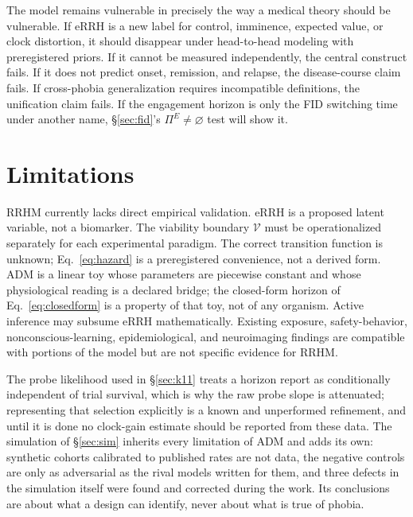 \documentclass[9pt,twocolumn]{article}
\newcommand{\Vset}{\mathcal{V}}
\begin{document}
The model remains vulnerable in precisely the way a medical theory should be vulnerable. If eRRH is a new label for control, imminence, expected value, or clock distortion, it should disappear under head-to-head modeling with preregistered priors. If it cannot be measured independently, the central construct fails. If it does not predict onset, remission, and relapse, the disease-course claim fails. If cross-phobia generalization requires incompatible definitions, the unification claim fails. If the engagement horizon is only the FID switching time under another name, \S\ref{sec:fid}'s $\Pi^E\neq\varnothing$ test will show it.

\section{Limitations}
\label{sec:limits}
RRHM currently lacks direct empirical validation. eRRH is a proposed latent variable, not a biomarker. The viability boundary $\Vset$ must be operationalized separately for each experimental paradigm. The correct transition function is unknown; Eq.~\ref{eq:hazard} is a preregistered convenience, not a derived form. ADM is a linear toy whose parameters are piecewise constant and whose physiological reading is a declared bridge; the closed-form horizon of Eq.~\ref{eq:closedform} is a property of that toy, not of any organism. Active inference may subsume eRRH mathematically. Existing exposure, safety-behavior, nonconscious-learning, epidemiological, and neuroimaging findings are compatible with portions of the model but are not specific evidence for RRHM.

The probe likelihood used in \S\ref{sec:k11} treats a horizon report as conditionally independent of trial survival, which is why the raw probe slope is attenuated; representing that selection explicitly is a known and unperformed refinement, and until it is done no clock-gain estimate should be reported from these data. The simulation of \S\ref{sec:sim} inherits every limitation of ADM and adds its own: synthetic cohorts calibrated to published rates are not data, the negative controls are only as adversarial as the rival models written for them, and three defects in the simulation itself were found and corrected during the work. Its conclusions are about what a design can identify, never about what is true of phobia.
\end{document}
